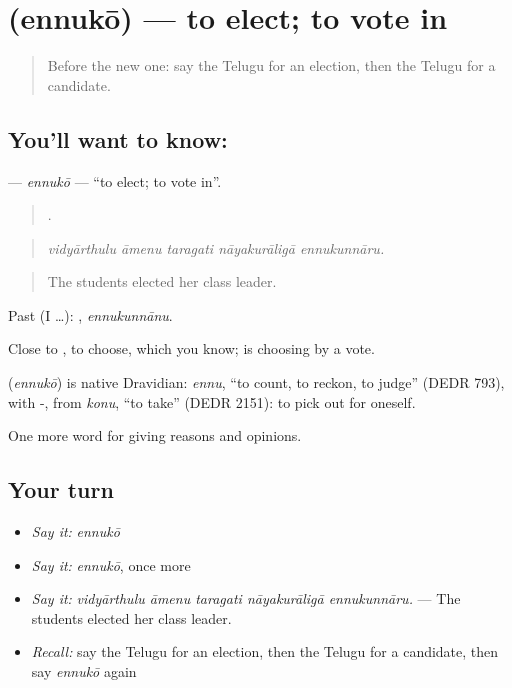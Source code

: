 \section[\texorpdfstring{\te{ఎన్నుకో} (ennukō)}{ఎన్నుకో (ennukō)}]{ (ennukō) — to elect; to vote in}

\label{lesson:TE-C400-ennuko}



\begin{quote}
Before the new one: say the Telugu for an election, then the Telugu for a candidate.
\end{quote}

\subsection*{You'll want to know: }
\textbf{} — \emph{ennukō} — \textquotedblleft{}to elect; to vote in\textquotedblright{}.

\begin{quote}
    .
\end{quote}

\begin{quote}
\emph{vidyārthulu āmenu taragati nāyakurāligā ennukunnāru.}
\end{quote}

\begin{quote}
The students elected her class leader.
\end{quote}

Past (I …): , \emph{ennukunnānu}.

Close to , to choose, which you know;  is choosing by a vote.

\begin{cousinweb}
\textbf{} (\emph{ennukō}) is native Dravidian: \emph{ennu}, \textquotedblleft{}to count, to reckon, to judge\textquotedblright{} (DEDR 793), with -, from \emph{konu}, \textquotedblleft{}to take\textquotedblright{} (DEDR 2151): to pick out for oneself.
\end{cousinweb}

\begin{grammarlens}[title={What you've built}]
One more word for giving reasons and opinions.
\end{grammarlens}

\subsection*{Your turn}
\begin{itemize}
\raggedright
  \item \emph{Say it:} \emph{ennukō}
  \item \emph{Say it:} \emph{ennukō}, once more
  \item \emph{Say it:} \emph{vidyārthulu āmenu taragati nāyakurāligā ennukunnāru.} — The students elected her class leader.
  \item \emph{Recall:} say the Telugu for an election, then the Telugu for a candidate, then say \emph{ennukō} again
\end{itemize}

